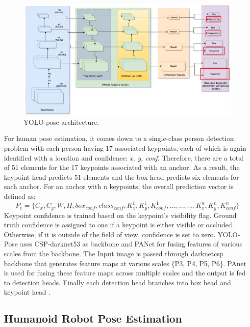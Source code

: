 \begin{figure}[ht]
  \centering
  \includegraphics[scale=1.01]{gambar/yolo-architecture.png}
  \caption{YOLO-pose architecture.}
  \label{fig:YOLO-pose-architecture}
\end{figure}

For human pose estimation, it comes down to a single-class person detection problem with each person having 17 associated keypoints, each of which is again identified with a location and confidence: \emph{{x, y, conf}}.
Therefore, there are a total of 51 elements for the 17 keypoints associated with an anchor. As a result, the keypoint head predicts 51 elements and the box head predicts six elements for each anchor.
For an anchor with n keypoints, the overall prediction vector is defined as:
\begin{equation}
  \label{eq:yoloresult}
  P_v = \bigl\{ C_x, C_y, W, H, box_{conf}, class_{conf}, K_x^1, K_y^1, K_{conf}^1, ..., ..., ..., K_x^n, K_y^n, K_{conf}^n \bigr\}
\end{equation}
Keypoint confidence is trained based on the keypoint's visibility flag. Ground truth confidence is assigned to one if a keypoint is either visible or occluded. Otherwise, if it is outside of the field of view, confidence is set to zero.
YOLO-Pose uses CSP-darknet53 \parencite{wang2020} as backbone and PANet \parencite{liu2018} for fusing features of various scales from the backbone.
The Input image is passed through darknetcsp backbone that generates feature maps at
various scales \{P3, P4, P5, P6\}. PAnet is used for fusing these feature maps across multiple scales and the output is fed to detection
heads. Finally each detection head branches into box head and keypoint head \parencite{maji2022yolopose}.


\subsection{Humanoid Robot Pose Estimation}
\label{subsec:humanoidrobotposeestimation}

